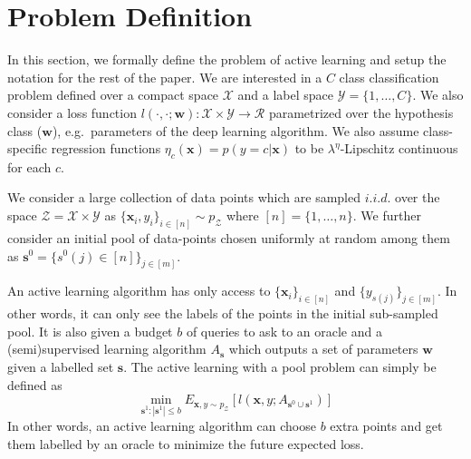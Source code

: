 \documentclass{article}
\begin{document}
\section{Problem Definition}
In this section, we formally define the problem of active learning and setup the notation for the rest of the paper. We are interested in a $C$ class classification problem defined over a compact space $\mathcal{X}$ and a label space  $\mathcal{Y}=\{1,\ldots,C\}$. We also consider a loss function $l(\cdot,\cdot;\mathbf{w}):\mathcal{X}\times \mathcal{Y} \rightarrow \mathcal{R}$ parametrized over the hypothesis class ($\mathbf{w}$), e.g.\ parameters of the deep learning algorithm. We also assume class-specific regression functions $\eta_c(\mathbf{x})=p(y=c|\mathbf{x})$ to be \mbox{$\lambda^\eta$-Lipschitz} continuous for each $c$.

We consider a large collection of data points which are sampled $i.i.d.$ over the space  $\mathcal{Z}=\mathcal{X}\times\mathcal{Y}$ as \mbox{$\{\mathbf{x}_i,y_i\}_{i \in [n]} \sim p_\mathcal{Z}$} where $[n]=\{1,\ldots,n\}$. We further consider an initial pool of data-points chosen uniformly at random among them as \mbox{$\mathbf{s}^0=\{s^0(j) \in [n]\}_{j \in [m]}$}.

An active learning algorithm has only access to $\{\mathbf{x}_i\}_{i \in [n]}$ and $\{y_{s(j)}\}_{j \in [m] }$. In other words, it can only see the labels of the points in the initial sub-sampled pool. It is also given a budget $b$ of queries to ask to an oracle and a (semi)supervised learning algorithm $A_{\mathbf{s}}$ which outputs a set of parameters $\mathbf{w}$ given a labelled set $\mathbf{s}$. The active learning with a pool problem can simply be defined as
\begin{equation}
\min_{\mathbf{s}^1 : |\mathbf{s}^1| \leq b} E_{\mathbf{x},y \sim p_\mathcal{Z}} [l(\mathbf{x},y; A_{\mathbf{s}^0 \cup \mathbf{s}^1})]
\end{equation}
In other words, an active learning algorithm can choose $b$ extra points and get them labelled by an oracle to minimize the future expected loss.
\end{document}
